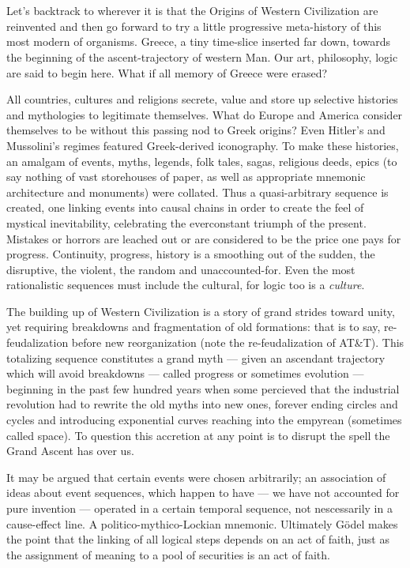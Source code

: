 \chapter{}

Let's backtrack to wherever it is that the Origins of Western Civilization are reinvented and then go forward to try a little progressive meta-history of this most modern of organisms. Greece, a tiny time-slice inserted far down, towards the beginning of the ascent-trajectory of western Man. Our art, philosophy, logic are said to begin here. What if all memory of Greece were erased?

All countries, cultures and religions secrete, value and store up selective histories and mythologies to legitimate themselves. What do Europe and America consider themselves to be without this passing nod to Greek origins? Even Hitler's and Mussolini's regimes featured Greek-derived iconography. To make these histories, an amalgam of events, myths, legends, folk tales, sagas, religious deeds, epics (to say nothing of vast storehouses of paper, as well as appropriate mnemonic architecture and monuments) were collated. Thus a quasi-arbitrary sequence is created, one linking events into causal chains in order to create the feel of mystical inevitability, celebrating the everconstant triumph of the present. Mistakes or horrors are leached out or are considered to be the price one pays for progress. Continuity, progress, history is a smoothing out of the sudden, the disruptive, the violent, the random and unaccounted-for. Even the most rationalistic sequences must include the cultural, for logic too is a \emph{culture}.

The building up of Western Civilization is a story of grand strides toward unity, yet requiring breakdowns and fragmentation of old formations: that is to say, re-feudalization before new reorganization (note the re-feudalization of AT\&T). This totalizing sequence constitutes a grand myth --- given an ascendant trajectory which will avoid breakdowns --- called progress or sometimes evolution --- beginning in the past few hundred years when some percieved that the industrial revolution had to rewrite the old myths into new ones, forever ending circles and cycles and introducing exponential curves reaching into the empyrean (sometimes called space). To question this accretion at any point is to disrupt the spell the Grand Ascent has over us.

It may be argued that certain events were chosen arbitrarily; an association of ideas about event sequences, which happen to have --- we have not accounted for pure invention --- operated in a certain temporal sequence, not nescessarily in a cause-effect line. A politico-mythico-Lockian mnemonic. Ultimately G\"{o}del makes the point that the linking of all logical steps depends on an act of faith, just as the assignment of meaning to a pool of securities is an act of faith.

